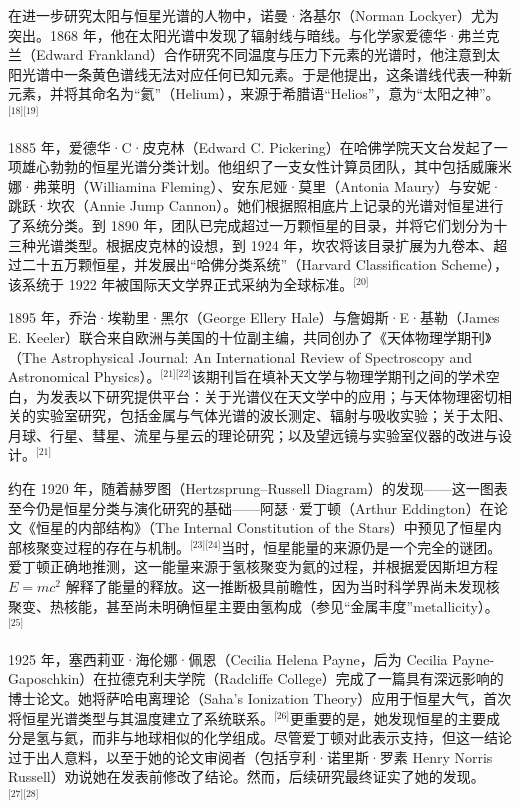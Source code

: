 在进一步研究太阳与恒星光谱的人物中，诺曼·洛基尔（Norman Lockyer）尤为突出。1868 年，他在太阳光谱中发现了辐射线与暗线。与化学家爱德华·弗兰克兰（Edward Frankland）合作研究不同温度与压力下元素的光谱时，他注意到太阳光谱中一条黄色谱线无法对应任何已知元素。于是他提出，这条谱线代表一种新元素，并将其命名为“氦”（Helium），来源于希腊语“Helios”，意为“太阳之神”。\(^\text{[18][19]}\)

1885 年，爱德华·C·皮克林（Edward C. Pickering）在哈佛学院天文台发起了一项雄心勃勃的恒星光谱分类计划。他组织了一支女性计算员团队，其中包括威廉米娜·弗莱明（Williamina Fleming）、安东尼娅·莫里（Antonia Maury）与安妮·跳跃·坎农（Annie Jump Cannon）。她们根据照相底片上记录的光谱对恒星进行了系统分类。到 1890 年，团队已完成超过一万颗恒星的目录，并将它们划分为十三种光谱类型。根据皮克林的设想，到 1924 年，坎农将该目录扩展为九卷本、超过二十五万颗恒星，并发展出“哈佛分类系统”（Harvard Classification Scheme），该系统于 1922 年被国际天文学界正式采纳为全球标准。\(^\text{[20]}\)

1895 年，乔治·埃勒里·黑尔（George Ellery Hale）与詹姆斯·E·基勒（James E. Keeler）联合来自欧洲与美国的十位副主编，共同创办了《天体物理学期刊》（The Astrophysical Journal: An International Review of Spectroscopy and Astronomical Physics）。\(^\text{[21][22]}\)该期刊旨在填补天文学与物理学期刊之间的学术空白，为发表以下研究提供平台：关于光谱仪在天文学中的应用；与天体物理密切相关的实验室研究，包括金属与气体光谱的波长测定、辐射与吸收实验；关于太阳、月球、行星、彗星、流星与星云的理论研究；以及望远镜与实验室仪器的改进与设计。\(^\text{[21]}\)

约在 1920 年，随着赫罗图（Hertzsprung–Russell Diagram）的发现——这一图表至今仍是恒星分类与演化研究的基础——阿瑟·爱丁顿（Arthur Eddington）在论文《恒星的内部结构》（The Internal Constitution of the Stars）中预见了恒星内部核聚变过程的存在与机制。\(^\text{[23][24]}\)当时，恒星能量的来源仍是一个完全的谜团。爱丁顿正确地推测，这一能量来源于氢核聚变为氦的过程，并根据爱因斯坦方程 $E = mc^2$ 解释了能量的释放。这一推断极具前瞻性，因为当时科学界尚未发现核聚变、热核能，甚至尚未明确恒星主要由氢构成（参见“金属丰度”metallicity）。\(^\text{[25]}\)

1925 年，塞西莉亚·海伦娜·佩恩（Cecilia Helena Payne，后为 Cecilia Payne-Gaposchkin）在拉德克利夫学院（Radcliffe College）完成了一篇具有深远影响的博士论文。她将萨哈电离理论（Saha’s Ionization Theory）应用于恒星大气，首次将恒星光谱类型与其温度建立了系统联系。\(^\text{[26]}\)更重要的是，她发现恒星的主要成分是氢与氦，而非与地球相似的化学组成。尽管爱丁顿对此表示支持，但这一结论过于出人意料，以至于她的论文审阅者（包括亨利·诺里斯·罗素 Henry Norris Russell）劝说她在发表前修改了结论。然而，后续研究最终证实了她的发现。\(^\text{[27][28]}\)

